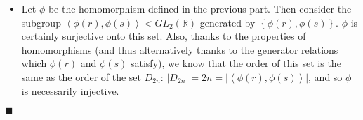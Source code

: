 \documentclass[12pt]{article}
\renewcommand{\qed}{\hfill$\blacksquare$}
\renewenvironment{proof}{\begin{addmargin}[1em]{0em}\begin{newproof}}{\end{newproof}\end{addmargin}\qed}
\begin{document}
\begin{proof}
\begin{itemize}
    \item Let $\phi$ be the homomorphism defined in the previous part. Then consider the subgroup $\left\langle \phi\left(r\right),\phi\left(s\right)\right\rangle < GL_2\left(\mathbb{R}\right)$ generated by $\left\{\phi\left(r\right),\phi\left(s\right)\right\}$. $\phi$ is certainly surjective onto this set. Also, thanks to the properties of homomorphisms (and thus alternatively thanks to the generator relations which $\phi\left(r\right)$ and $\phi\left(s\right)$ satisfy), we know that the order of this set is the same as the order of the set $D_{2n}$: $\left|D_{2n}\right|=2n=\left|\left\langle \phi\left(r\right),\phi\left(s\right)\right\rangle \right|$, and so $\phi$ is necessarily injective.
\end{itemize}
\end{proof}
\end{document}
